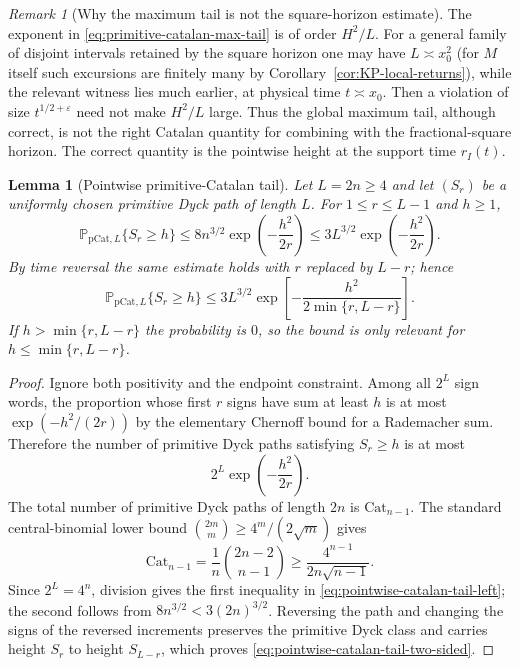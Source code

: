\documentclass[11pt]{amsart}
\numberwithin{equation}{section}
\theoremstyle{plain}
\newtheorem{lemma}[theorem]{Lemma}
\theoremstyle{definition}
\theoremstyle{remark}
\newtheorem{remark}[theorem]{Remark}
\newcommand{\eps}{\varepsilon}
\begin{document}
\begin{remark}[Why the maximum tail is not the square-horizon estimate]
\label{rem:max-tail-square-limit}
The exponent in \eqref{eq:primitive-catalan-max-tail} is of order
$H^2/L$.  For a general family of disjoint intervals retained by the
square horizon one may have $L\asymp x_0^2$ (for $M$ itself such excursions
are finitely many by Corollary~\ref{cor:KP-local-returns}), while the relevant witness lies much earlier, at physical
time $t\asymp x_0$.  Then a violation of size $t^{1/2+\eps}$ need not make
$H^2/L$ large.  Thus the global maximum tail, although correct, is not the
right Catalan quantity for combining with the fractional-square horizon.
The correct quantity is the pointwise height at the support time
$r_I(t)$.
\end{remark}

\begin{lemma}[Pointwise primitive-Catalan tail]
\label{lem:pointwise-catalan-tail}
Let $L=2n\ge4$ and let $(S_r)$ be a uniformly chosen primitive Dyck path of
length $L$.  For $1\le r\le L-1$ and $h\ge1$,
\begin{equation}
\label{eq:pointwise-catalan-tail-left}
 \mathbb P_{\mathrm{pCat},L}\{S_r\ge h\}
 \le 8n^{3/2}\exp\!\left(-\frac{h^2}{2r}\right)
 \le 3L^{3/2}\exp\!\left(-\frac{h^2}{2r}\right).
\end{equation}
By time reversal the same estimate holds with $r$ replaced by $L-r$;
hence
\begin{equation}
\label{eq:pointwise-catalan-tail-two-sided}
 \mathbb P_{\mathrm{pCat},L}\{S_r\ge h\}
 \le 3L^{3/2}
 \exp\!\left[-\frac{h^2}{2\min\{r,L-r\}}\right].
\end{equation}
If $h>\min\{r,L-r\}$ the probability is $0$, so the bound is only
relevant for $h\le\min\{r,L-r\}$.
\end{lemma}

\begin{proof}
Ignore both positivity and the endpoint constraint.  Among all $2^L$ sign
words, the proportion whose first $r$ signs have sum at least $h$ is at most
$\exp(-h^2/(2r))$ by the elementary Chernoff bound for a Rademacher sum.
Therefore the number of primitive Dyck paths satisfying $S_r\ge h$ is at
most
\[
 2^L\exp\!\left(-\frac{h^2}{2r}\right).
\]
The total number of primitive Dyck paths of length $2n$ is $\mathrm{Cat}_{n-1}$.  The
standard central-binomial lower bound
$\binom{2m}{m}\ge4^m/(2\sqrt m)$ gives
\[
 \mathrm{Cat}_{n-1}=\frac1n\binom{2n-2}{n-1}
 \ge\frac{4^{n-1}}{2n\sqrt{n-1}}.
\]
Since $2^L=4^n$, division gives the first inequality in
\eqref{eq:pointwise-catalan-tail-left}; the second follows from
$8n^{3/2}<3(2n)^{3/2}$.  Reversing the path and changing the signs of the
reversed increments preserves the primitive Dyck class and carries height
$S_r$ to height $S_{L-r}$, which proves
\eqref{eq:pointwise-catalan-tail-two-sided}.
\end{proof}
\end{document}
